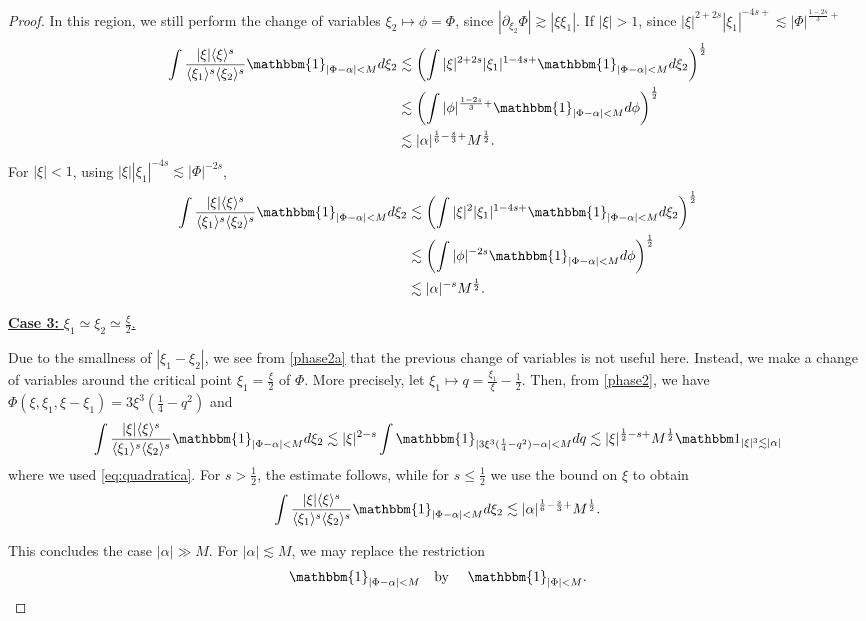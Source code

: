 \documentclass[%
11pt,  reqno]{amsart}
\newcommand{\fia}{\mathbbm{1}_{|\Phi-\alpha|<M}}
\newcommand{\jap}[1]{\langle #1 \rangle}
\newcommand{\5}{\textup{V}}
\newcommand{\noi}{\noindent}
\newcommand{\ind}{\mathbbm 1}
\newcommand{\les}{\lesssim}
\theoremstyle{remark}
\newcommand{\al}{\alpha}
\numberwithin{equation}{section}
\numberwithin{theorem}{section}
\begin{document}
\begin{proof}
In this region, we still perform the change of variables $\xi_2\mapsto \phi=\Phi$, since $|\partial_{\xi_2}\Phi|\gtrsim |\xi\xi_1|$. If $|\xi|>1$, since $|\xi|^{2+2s}|\xi_1|^{-4s+}\lesssim |\Phi|^{\frac{1-2s}{3}+} $
\begin{align*}
    \int \frac{|\xi|\jap{\xi}^s}{\jap{\xi_1}^s\jap{\xi_2}^s}\fia d\xi_2 &\lesssim \left(\int |\xi|^{2+2s}|\xi_1|^{1-4s+}\fia d\xi_2\right)^\frac12\\& \lesssim \left(\int |\phi|^{\frac{1-2s}{3}+}\fia d\phi\right)^\frac12\\&\lesssim |\alpha|^{\frac16 - \frac s3 +} M^{\frac12}.
\end{align*}
For $|\xi|<1$, using $|\xi||\xi_1|^{-4s}\lesssim |\Phi|^{-2s}$,
\begin{align*}
    \int \frac{|\xi|\jap{\xi}^s}{\jap{\xi_1}^s\jap{\xi_2}^s}\fia d\xi_2 &\lesssim \left(\int |\xi|^{2}|\xi_1|^{1-4s+}\fia d\xi_2\right)^\frac12\\& \lesssim \left(\int |\phi|^{-2s}\fia d\phi\right)^\frac12\\&\lesssim |\alpha|^{-s} M^{\frac12}.
\end{align*}



\smallskip

\noi
\underline{
\textbf{Case 3:} $\xi_1\simeq \xi_2 \simeq \frac{\xi}{2}$.} 

Due to the smallness of $|\xi_1-\xi_2|$, we see from \eqref{phase2a} that the previous change of variables is not useful here. Instead,
we make a change of variables around the critical point $\xi_1 = \frac\xi2$ of $\Phi$. More precisely, let $\xi_1 \mapsto q = \frac{\xi_1}{\xi} - \frac12$. Then, from \eqref{phase2}, we have $\Phi (\xi, \xi_1,\xi-\xi_1)=  3 \xi^3 (\frac14 - q^2)$ and 
\begin{align*}
\int \frac{|\xi|\jap{\xi}^s}{\jap{\xi_1}^s\jap{\xi_2}^s}\fia d\xi_2 \lesssim |\xi|^{2-s}\int \mathbbm{1}_{|3 \xi^3 (\frac14 - q^2)-\alpha|<M}dq \les |\xi|^{\frac12-s +} M^\frac12  \ind_{|\xi|^3 \les |\al|}
\end{align*}
where we used \eqref{eq:quadratica}. For $s> \frac12$, the estimate follows, while for $s\le\frac12$ we use the bound on $\xi$ to obtain
\begin{align}
\int \frac{|\xi|\jap{\xi}^s}{\jap{\xi_1}^s\jap{\xi_2}^s}\fia d\xi_2 \les |\alpha|^{\frac16-\frac s3+} M^\frac12. 
\end{align}


\smallskip

This concludes the case $|\alpha|\gg M$. For $|\alpha|\lesssim M$, we may replace the restriction
$$
\fia \quad \mbox{by }\quad \mathbbm{1}_{|\Phi|<M}.
$$


\end{proof}
\end{document}
